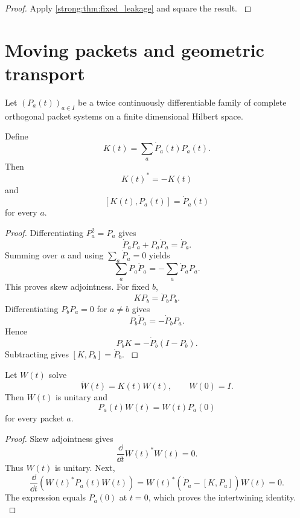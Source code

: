 \begin{proof}\label{strong:proof:020}
Apply \cref{strong:thm:fixed_leakage} and square the result.
\label{strong:proof:020:end}\end{proof}

\section{Moving packets and geometric transport}\label{strong:section:006}\label{strong:sec:moving_packets}

Let \((P_a(t))_{a\in I}\) be a twice continuously differentiable family of complete orthogonal packet systems on a finite dimensional Hilbert space.

\begin{theorem}\label{strong:theorem:012}\label{strong:thm:kato_connection}
Define
\[
K(t)
=
\sum_a\dot P_a(t)P_a(t).
\]
Then
\[
K(t)^*=-K(t)
\]
and
\[
[K(t),P_a(t)]=\dot P_a(t)
\]
for every \(a\).
\end{theorem}

\begin{proof}\label{strong:proof:021}
Differentiating \(P_a^2=P_a\) gives
\[
\dot P_aP_a+P_a\dot P_a=\dot P_a.
\]
Summing over \(a\) and using \(\sum_a\dot P_a=0\) yields
\[
\sum_aP_a\dot P_a=-\sum_a\dot P_aP_a.
\]
This proves skew adjointness. For fixed \(b\),
\[
KP_b=\dot P_bP_b.
\]
Differentiating \(P_bP_a=0\) for \(a\neq b\) gives
\[
P_b\dot P_a=-\dot P_bP_a.
\]
Hence
\[
P_bK=-\dot P_b(I-P_b).
\]
Subtracting gives \([K,P_b]=\dot P_b\).
\label{strong:proof:021:end}\end{proof}

\begin{theorem}\label{strong:theorem:013}\label{strong:thm:kato_transport}
Let \(W(t)\) solve
\[
\dot W(t)=K(t)W(t),
\qquad
W(0)=I.
\]
Then \(W(t)\) is unitary and
\[
P_a(t)W(t)=W(t)P_a(0)
\]
for every packet \(a\).
\end{theorem}

\begin{proof}\label{strong:proof:022}
Skew adjointness gives
\[
\frac{\dd}{\dd t}W(t)^*W(t)=0.
\]
Thus \(W(t)\) is unitary. Next,
\[
\frac{\dd}{\dd t}
\left(W(t)^*P_a(t)W(t)\right)
=
W(t)^*
\left(
\dot P_a-[K,P_a]
\right)
W(t)=0.
\]
The expression equals \(P_a(0)\) at \(t=0\), which proves the intertwining identity.
\label{strong:proof:022:end}\end{proof}

